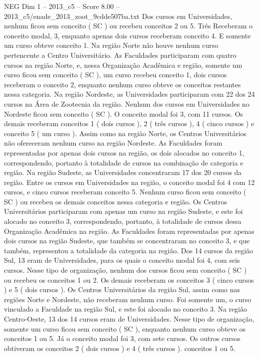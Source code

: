 \begin{textsample}{NEG Dim 1 – 2013\_c5 – Score 8.00 – 2013\_c5/enade\_2013\_zoot\_9cdde507ba.txt}
Dos cursos em Universidades, nenhum ficou sem conceito ( SC ) ou recebeu conceitos 2 ou 5.
Três Receberam o conceito modal, 3, enquanto apenas dois cursos receberam conceito 4.
E somente um curso obteve conceito 1.
Na região Norte não houve nenhum curso pertencente a Centro Universitário.
As Faculdades participaram com quatro cursos na região Norte, e, nessa Organização Acadêmica e região, somente um curso ficou sem conceito ( SC ), um curso recebeu conceito 1, dois cursos receberam o conceito 2, enquanto nenhum curso obteve os conceitos restantes nessa categoria.
Na região Nordeste, as Universidades participaram com 22 dos 24 cursos na Área de Zootecnia da região.
Nenhum dos cursos em Universidades no Nordeste ficou sem conceito ( SC ).
O conceito modal foi 3, com 11 cursos.
Os demais receberam conceitos 1 ( dois cursos ), 2 ( três cursos ), 4 ( cinco cursos ) e conceito 5 ( um curso ).
Assim como na região Norte, os Centros Universitários não ofereceram nenhum curso na região Nordeste.
As Faculdades foram representadas por apenas dois cursos na região, os dois alocados no conceito 1, correspondendo, portanto à totalidade de cursos na combinação de categoria e região.
Na região Sudeste, as Universidades concentraram 17 dos 20 cursos da região.
Entre os cursos em Universidades na região, o conceito modal foi 4 com 12 cursos, e cinco cursos receberam conceito 5.
Nenhum curso ficou sem conceito ( SC ) ou recebeu os demais conceitos nessa categoria e região.
Os Centros Universitários participaram com apenas um curso na região Sudeste, e este foi alocado no conceito 3, correspondendo, portanto, à totalidade de cursos dessa Organização Acadêmica na região.
As Faculdades foram representadas por apenas dois cursos na região Sudeste, que também se concentraram no conceito 3, e que também, representou a totalidade da categoria na região.
Dos 14 cursos da região Sul, 13 eram de Universidades, para os quais o conceito modal foi 4, com seis cursos.
Nesse tipo de organização, nenhum dos cursos ficou sem conceito ( SC ) ou recebeu os conceitos 1 ou 2.
Os demais receberam os conceitos 3 ( cinco cursos ) e 5 ( dois cursos ).
Os Centros Universitários da região Sul, assim como nas regiões Norte e Nordeste, não receberam nenhum curso.
Foi somente um, o curso vinculado a Faculdade na região Sul, e este foi alocado no conceito 3.
Na região Centro-Oeste, 13 dos 14 cursos eram de Universidades.
Nesse tipo de organização, somente um curso ficou sem conceito ( SC ), enquanto nenhum curso obteve os conceitos 1 ou 5.
Já o conceito modal foi 3, com sete cursos.
Os outros cursos obtiveram os conceitos 2 ( dois cursos ) e 4 ( três cursos ). conceitos 1 ou 5.

\end{textsample}
